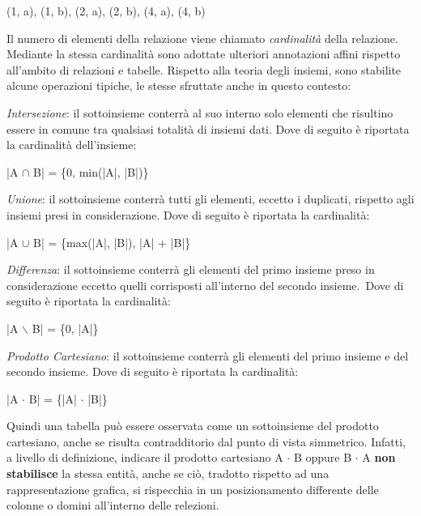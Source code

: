 \documentclass{article}
\begin{document}
\vspace{-\baselineskip}
\begin{center}
    \item (1, a), (1, b), (2, a), (2, b), (4, a), (4, b)
\end{center}
\vspace{14pt}
Il numero di elementi della relazione viene chiamato \textit{cardinalità} della relazione. Mediante la stessa cardinalità sono adottate ulteriori annotazioni affini rispetto all'ambito di relazioni e tabelle. Rispetto alla teoria degli insiemi, sono stabilite alcune operazioni tipiche, le stesse sfruttate anche in questo contesto:
\begin{enumerate}
    \renewcommand{\labelenumi}{-}
    \item \textit{Intersezione}: il sottoinsieme conterrà al suo interno solo elementi che risultino essere in comune tra qualsiasi totalità di insiemi dati. Dove di seguito è riportata la cardinalità dell'insieme:
    \vspace{-\baselineskip}
    \begin{center}
        \item |A $\cap$ B| = \{0, min(|A|, |B|)\}
    \end{center}
    \item \textit{Unione}: il sottoinsieme conterrà tutti gli elementi, eccetto i duplicati, rispetto agli insiemi presi in considerazione. Dove di seguito è riportata la cardinalità:
    \vspace{-\baselineskip}
    \begin{center}
        \item |A $\cup$ B| = \{max(|A|, |B|), |A| + |B|\}
    \end{center}
    \item \textit{Differenza}: il sottoinsieme conterrà gli elementi del primo insieme preso in considerazione eccetto quelli corrisposti all'interno del secondo insieme.\ Dove di seguito è riportata la cardinalità:
    \vspace{-\baselineskip}
    \begin{center}
        \item |A $\backslash$ B| = \{0, |A|\}
    \end{center}
    \item \textit{Prodotto Cartesiano}: il sottoinsieme conterrà gli elementi del primo insieme e del secondo insieme. Dove di seguito è riportata la cardinalità:
    \vspace{-\baselineskip}
    \begin{center}
        \item |A $\cdot$ B| = \{|A| $\cdot$ |B|\}
    \end{center}
\end{enumerate}
Quindi una tabella può essere osservata come un sottoinsieme del prodotto cartesiano, anche se risulta contradditorio dal punto di vista simmetrico. Infatti, a livello di definizione, indicare il prodotto cartesiano A $\cdot$ B oppure B $\cdot$ A \textbf{non stabilisce} la stessa entità, anche se ciò, tradotto rispetto ad una rappresentazione grafica, si rispecchia in un posizionamento differente delle colonne o domini all'interno delle relezioni.
\end{document}
